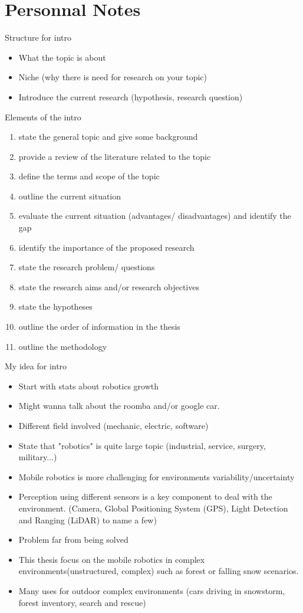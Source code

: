 \chapter{Personnal Notes}

Structure for intro
\begin{itemize}
    \item What the topic is about
    \item Niche (why there is need for research on your topic)
    \item Introduce the current research (hypothesis, research question)
\end{itemize}

Elements of the intro
\begin{enumerate}
    \item state the general topic and give some background
    \item provide a review of the literature related to the topic
    \item define the terms and scope of the topic
    \item outline the current situation
    \item evaluate the current situation (advantages/ disadvantages) and identify the gap
    \item identify the importance of the proposed research
    \item state the research problem/ questions
    \item state the research aims and/or research objectives
    \item state the hypotheses
    \item outline the order of information in the thesis
    \item outline the methodology
\end{enumerate}

My idea for intro
\begin{itemize}
    \item Start with stats about robotics growth
    \item Might wanna talk about the roomba and/or google car.
    \item Different field involved (mechanic, electric, software)
    \item State that "robotics" is quite large topic (industrial, service, surgery, military...)
    \item Mobile robotics is more challenging for environments variability/uncertainty
    \item Perception using different sensors is a key component to deal with the environment. (Camera, Global Positioning System (GPS), Light Detection and Ranging (LiDAR) to name a few)
    \item Problem far from being solved
    \item This thesis focus on the mobile robotics in complex environments(unstructured, complex) such as forest or falling snow scenarios.
    \item Many uses for outdoor complex environments (cars driving in snowstorm, forest inventory, search and rescue)
\end{itemize}

